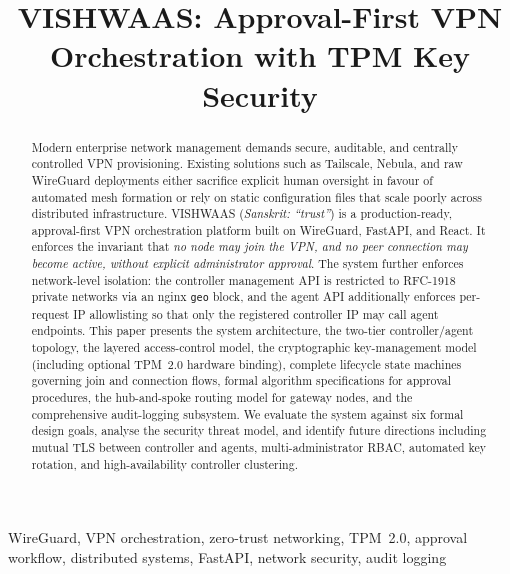 \documentclass[conference]{IEEEtran}
\begin{document}
\title{VISHWAAS: Approval-First VPN Orchestration with TPM Key Security }

\author{
}

\maketitle

\begin{abstract}
Modern enterprise network management demands secure, auditable, and centrally
controlled VPN provisioning. Existing solutions such as Tailscale, Nebula, and
raw WireGuard deployments either sacrifice explicit human oversight in favour of
automated mesh formation or rely on static configuration files that scale poorly
across distributed infrastructure. VISHWAAS (\textit{Sanskrit: ``trust''}) is a
production-ready, approval-first VPN orchestration platform built on WireGuard,
FastAPI, and React. It enforces the invariant that \emph{no node may join the
VPN, and no peer connection may become active, without explicit administrator
approval}. The system further enforces network-level isolation: the controller
management API is restricted to RFC-1918 private networks via an nginx \texttt{geo}
block, and the agent API additionally enforces per-request IP allowlisting so that
only the registered controller IP may call agent endpoints. This paper presents the
system architecture, the two-tier controller\slash{}agent topology, the layered
access-control model, the cryptographic key-management model (including optional
TPM~2.0 hardware binding), complete lifecycle state machines governing join and
connection flows, formal algorithm specifications for approval procedures, the
hub-and-spoke routing model for gateway nodes, and the
comprehensive audit-logging subsystem. We evaluate the system against six formal
design goals, analyse the security threat model, and identify future directions
including mutual TLS between controller and agents, multi-administrator RBAC,
automated key rotation, and high-availability controller clustering.
\end{abstract}

\begin{IEEEkeywords}
WireGuard, VPN orchestration, zero-trust networking, TPM~2.0, approval workflow,
distributed systems, FastAPI, network security, audit logging
\end{IEEEkeywords}
\end{document}
